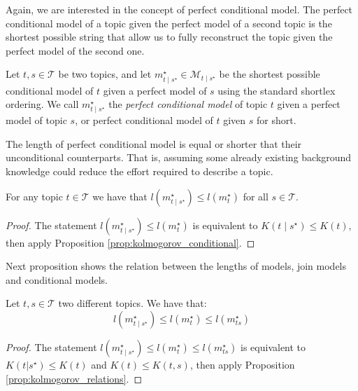 Again, we are interested in the concept of perfect conditional model. The perfect conditional model of a topic given the perfect model of a second topic is the shortest possible string that allow us to fully reconstruct the topic given the perfect model of the second one.

\begin{definition}
Let $t,s \in \mathcal{T}$ be two topics, and let $m_{t \mid s^\star}^{\star} \in \mathcal{M}_{t \mid s^\star}$ be the shortest possible conditional model of $t$ given a perfect model of $s$ using the standard shortlex ordering. We call $m_{t \mid s^\star}^{\star}$ the \emph{perfect conditional model} of topic $t$ given a perfect model of topic $s$, or perfect conditional model of $t$ given $s$ for short.
\end{definition}

The length of perfect conditional model is equal or shorter that their unconditional counterparts. That is, assuming some already existing background knowledge could reduce the effort required to describe a topic.

\begin{proposition}
\label{prop:description_conditional_inequality}
For any topic $t \in \mathcal{T}$ we have that $l \left( m_{t \mid s^\star}^{\star} \right) \leq l \left(m^\star_t\right)$ for all $s \in \mathcal{T}$.
\end{proposition}
\begin{proof}
The statement $l \left( m_{t \mid s^\star}^{\star} \right) \leq l \left(m^\star_t\right)$ is equivalent to $K(t \mid s^\star) \leq K(t)$, then apply Proposition \ref{prop:kolmogorov_conditional}.
\end{proof}

Next proposition shows the relation between the lengths of models, join models and conditional models.

\begin{proposition}
\label{prop:description_conditional_joint}
Let $t, s \in \mathcal{T}$ two different topics. We have that:
\[
l \left( m_{t \mid s^\star}^{\star} \right) \leq l \left( m_t^\star \right) \leq l \left( m_{ts}^\star \right)
\]
\end{proposition}
\begin{proof}
The statement $l \left( m_{t \mid s^\star}^{\star} \right) \leq l \left( m_t^\star \right) \leq l \left( m_{ts}^\star \right)$ is equivalent to $K(t | s^\star ) \leq K(t)$ and $K(t) \leq K(t, s)$, then apply Proposition \ref{prop:kolmogorov_relations}.
\end{proof}

